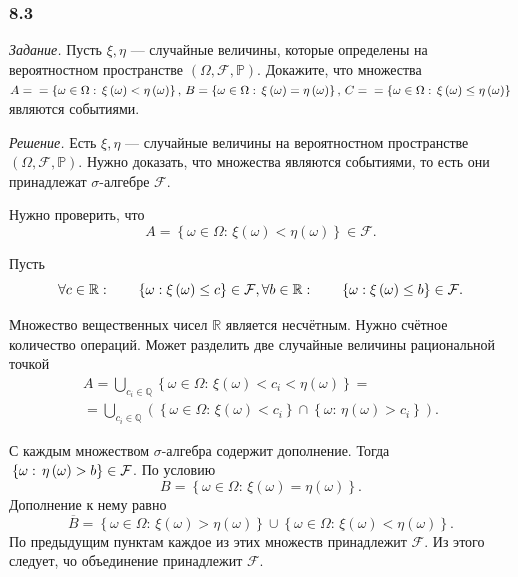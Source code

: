 \subsubsection*{8.3}

\textit{Задание.} Пусть $ \xi, \eta $ --- случайные величины, которые определены на вероятностном пространстве $ \left( \Omega, \mathcal{F}, \mathbb{P} \right) $.
Докажите,
что множества
$A = \\
= \left\{ \omega \in \Omega: \,
\xi \left( \omega \right) <
\eta \left( \omega \right) \right\}, \,
B =
\left\{ \omega \in \Omega: \,
\xi \left( \omega \right) =
\eta \left( \omega \right) \right\}, \,
C = \\
= \left\{ \omega \in \Omega: \,
\xi \left( \omega \right) \leq
\eta \left( \omega \right) \right\} $
являются событиями.

\textit{Решение.} Есть $ \xi, \eta $ --- случайные величины на вероятностном пространстве $ \left( \Omega, \mathcal{F}, \mathbb{P} \right) $.
Нужно доказать, что множества являются событиями, то есть они принадлежат $ \sigma $-алгебре $ \mathcal{F} $.

Нужно проверить, что
$$A =
\left\{ \omega \in \Omega: \,
\xi \left( \omega \right) <
\eta \left( \omega \right) \right\} \in
\mathcal{F}.$$

Пусть
$$ \forall c \in \mathbb{R}: \qquad \left\{ \omega: \xi \left( \omega \right) \leq c \right\} \in \mathcal{F}, \\
\forall b \in \mathbb{R}: \qquad \left\{ \omega: \xi \left( \omega \right) \leq b \right\} \in \mathcal{F}.$$

Множество вещественных чисел $ \mathbb{R} $ является несчётным.
Нужно счётное количество операций.
Может разделить две случайные величины рациональной точкой
\begin{equation*}
\begin{split}
A =
\bigcup \limits_{c_i \in \mathbb{Q} } \left\{ \omega \in \Omega: \, \xi \left( \omega \right) < c_i < \eta \left( \omega \right) \right\} = \\
= \bigcup \limits_{c_i \in \mathbb{Q} }
\left( \left\{ \omega \in \Omega: \, \xi \left( \omega \right) < c_i \right\} \cap
\left\{ \omega: \, \eta \left( \omega \right) > c_i \right\} \right).
\end{split}
\end{equation*}

С каждым множеством $ \sigma $-алгебра содержит дополнение.
Тогда
$ \\
\left\{ \omega: \, \eta \left( \omega \right) > b \right\} \in
\mathcal{F} $.
По условию
$$B =
\left\{ \omega \in \Omega: \,
\xi \left( \omega \right) =
\eta \left( \omega \right) \right\}.$$
Дополнение к нему равно
$$ \overline{B} =
\left\{ \omega \in \Omega: \,
\xi \left( \omega \right) >
\eta \left( \omega \right) \right\} \cup
\left\{ \omega \in \Omega: \,
\xi \left( \omega \right) <
\eta \left( \omega \right) \right\}.$$
По предыдущим пунктам каждое из этих множеств принадлежит $ \mathcal{F} $.
Из этого следует, чо объединение принадлежит $ \mathcal{F} $.


